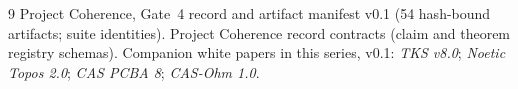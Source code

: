 \documentclass[11pt]{amsart}
\theoremstyle{definition}
\theoremstyle{remark}
\begin{document}
\begin{thebibliography}{9}
 Project Coherence, Gate~4 record and artifact manifest v0.1 (54 hash-bound artifacts; suite identities).
 Project Coherence record contracts (claim and theorem registry schemas).
 Companion white papers in this series, v0.1: \emph{TKS v8.0}; \emph{Noetic Topos 2.0}; \emph{CAS PCBA 8}; \emph{CAS-Ohm 1.0}.
\end{thebibliography}
\end{document}
